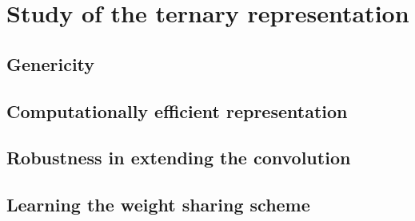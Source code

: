 \section{Study of the ternary representation}

\subsection{Genericity}

\subsection{Computationally efficient representation}

\subsection{Robustness in extending the convolution}

\subsection{Learning the weight sharing scheme}